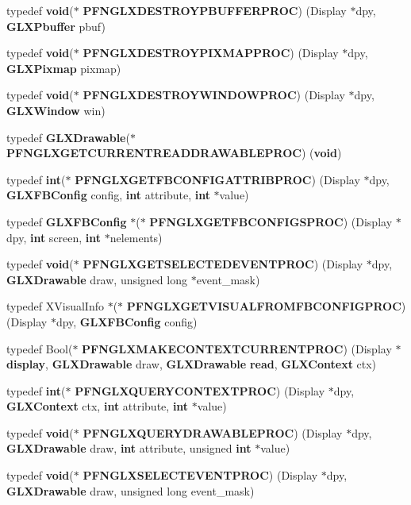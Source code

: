 \begin{DoxyCompactItemize}
\item 
typedef {\bf void}($\ast$ {\bf P\+F\+N\+G\+L\+X\+D\+E\+S\+T\+R\+O\+Y\+P\+B\+U\+F\+F\+E\+R\+P\+R\+OC}) (Display $\ast$dpy, {\bf G\+L\+X\+Pbuffer} pbuf)
\item 
typedef {\bf void}($\ast$ {\bf P\+F\+N\+G\+L\+X\+D\+E\+S\+T\+R\+O\+Y\+P\+I\+X\+M\+A\+P\+P\+R\+OC}) (Display $\ast$dpy, {\bf G\+L\+X\+Pixmap} pixmap)
\item 
typedef {\bf void}($\ast$ {\bf P\+F\+N\+G\+L\+X\+D\+E\+S\+T\+R\+O\+Y\+W\+I\+N\+D\+O\+W\+P\+R\+OC}) (Display $\ast$dpy, {\bf G\+L\+X\+Window} win)
\item 
typedef {\bf G\+L\+X\+Drawable}($\ast$ {\bf P\+F\+N\+G\+L\+X\+G\+E\+T\+C\+U\+R\+R\+E\+N\+T\+R\+E\+A\+D\+D\+R\+A\+W\+A\+B\+L\+E\+P\+R\+OC}) ({\bf void})
\item 
typedef {\bf int}($\ast$ {\bf P\+F\+N\+G\+L\+X\+G\+E\+T\+F\+B\+C\+O\+N\+F\+I\+G\+A\+T\+T\+R\+I\+B\+P\+R\+OC}) (Display $\ast$dpy, {\bf G\+L\+X\+F\+B\+Config} config, {\bf int} attribute, {\bf int} $\ast$value)
\item 
typedef {\bf G\+L\+X\+F\+B\+Config} $\ast$($\ast$ {\bf P\+F\+N\+G\+L\+X\+G\+E\+T\+F\+B\+C\+O\+N\+F\+I\+G\+S\+P\+R\+OC}) (Display $\ast$dpy, {\bf int} screen, {\bf int} $\ast$nelements)
\item 
typedef {\bf void}($\ast$ {\bf P\+F\+N\+G\+L\+X\+G\+E\+T\+S\+E\+L\+E\+C\+T\+E\+D\+E\+V\+E\+N\+T\+P\+R\+OC}) (Display $\ast$dpy, {\bf G\+L\+X\+Drawable} draw, unsigned long $\ast$event\+\_\+mask)
\item 
typedef X\+Visual\+Info $\ast$($\ast$ {\bf P\+F\+N\+G\+L\+X\+G\+E\+T\+V\+I\+S\+U\+A\+L\+F\+R\+O\+M\+F\+B\+C\+O\+N\+F\+I\+G\+P\+R\+OC}) (Display $\ast$dpy, {\bf G\+L\+X\+F\+B\+Config} config)
\item 
typedef Bool($\ast$ {\bf P\+F\+N\+G\+L\+X\+M\+A\+K\+E\+C\+O\+N\+T\+E\+X\+T\+C\+U\+R\+R\+E\+N\+T\+P\+R\+OC}) (Display $\ast${\bf display}, {\bf G\+L\+X\+Drawable} draw, {\bf G\+L\+X\+Drawable} {\bf read}, {\bf G\+L\+X\+Context} ctx)
\item 
typedef {\bf int}($\ast$ {\bf P\+F\+N\+G\+L\+X\+Q\+U\+E\+R\+Y\+C\+O\+N\+T\+E\+X\+T\+P\+R\+OC}) (Display $\ast$dpy, {\bf G\+L\+X\+Context} ctx, {\bf int} attribute, {\bf int} $\ast$value)
\item 
typedef {\bf void}($\ast$ {\bf P\+F\+N\+G\+L\+X\+Q\+U\+E\+R\+Y\+D\+R\+A\+W\+A\+B\+L\+E\+P\+R\+OC}) (Display $\ast$dpy, {\bf G\+L\+X\+Drawable} draw, {\bf int} attribute, unsigned {\bf int} $\ast$value)
\item 
typedef {\bf void}($\ast$ {\bf P\+F\+N\+G\+L\+X\+S\+E\+L\+E\+C\+T\+E\+V\+E\+N\+T\+P\+R\+OC}) (Display $\ast$dpy, {\bf G\+L\+X\+Drawable} draw, unsigned long event\+\_\+mask)

\end{DoxyCompactItemize}
